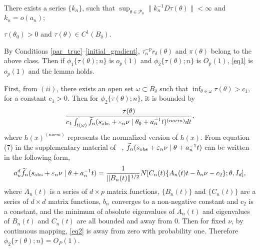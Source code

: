 \documentclass{article}
\begin{document}
	There exists a series $\{k_{n}\}$, such that $\sup_{\theta\in\mathcal{P}_{0}}\|k_{n}^{-1}D\tau(\theta)\|<\infty$
	and $k_{n}=o(a_{n});$ 
	
	$\tau(\theta_{0})>0$ and $\tau(\theta)\in C^{1}(B_{\delta}).$ 
	
	By Conditions \ref{par_true}--\ref{initial_gradient}, $\tau_{n}^{-p}r_{\delta}(\theta)$
	and $\pi(\theta)$ belong to the above class. Then if $\phi_{1}\{\tau(\theta);n\}$
	is $o_{p}(1)$ and $\phi_{2}\{\tau(\theta);n\}$ is $O_{p}(1)$, \eqref{eq1}
	is $o_{p}(1)$ and the lemma holds. 
	
	First, from $(ii)$, there exists an open set $\omega\subset B_{\delta}$
	such that $\inf_{\theta\in\omega}\tau(\theta)>c_{1}$, for a constant
	$c_{1}>0$. Then for $\phi_{2}\{\tau(\theta);n\}$, it is bounded
	by 
	\[
	\frac{\tau(\theta)}{c_{1}\int_{t(\omega)}\widetilde{f}_{n}(s_{{\rm obs}}+\varepsilon_{n}\nu\mid\theta_{0}+a_{n}^{-1}t)^{(norm)}dt},
	\]
	where $h(x)^{(norm)}$ represents the normalized version of $h(x)$.
	From equation (7) in the supplementary material of ~\cite{Li2016},
	$\widetilde{f}_{n}(s_{{\rm obs}}+\varepsilon_{n}\nu\mid\theta+a_{n}^{-1}t)$
	can be written in the following form, 
	\begin{eqnarray}
	a_{n}^{d}\widetilde{f}_{n}(s_{{\rm obs}}+\varepsilon_{n}\nu\mid\theta+a_{n}^{-1}t)=\frac{1}{\|B_{n}(t)\|^{1/2}}N[C_{n}(t)\{A_{n}(t)t-b_{n}\nu-c_{2}\};\theta,I_{d}],\label{eq2}
	\end{eqnarray}
	where $A_{n}(t)$ is a series of $d\times p$ matrix functions, $\{B_{n}(t)\}$
	and $\{C_{n}(t)\}$ are a series of $d\times d$ matrix functions,
	$b_{n}$ converges to a non-negative constant and $c_{2}$ is a constant,
	and the minimum of absolute eigenvalues of $A_{n}(t)$ and eigenvalues
	of $B_{n}(t)$ and $C_{n}(t)$ are all bounded and away from $0$.
	Then for fixed $\nu$, by continuous mapping, \eqref{eq2} is away
	from zero with probability one. Therefore $\phi_{2}\{\tau(\theta);n\}=O_{P}(1)$.
	
\end{document}
